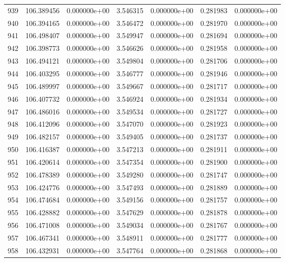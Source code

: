 \begin{tabular}{rrrrrrr}
 939 & 106.389456 &  0.000000e+00 &  3.546315 &  0.000000e+00 &   0.281983 &  0.000000e+00 \\
 940 & 106.394165 &  0.000000e+00 &  3.546472 &  0.000000e+00 &   0.281970 &  0.000000e+00 \\
 941 & 106.498407 &  0.000000e+00 &  3.549947 &  0.000000e+00 &   0.281694 &  0.000000e+00 \\
 942 & 106.398773 &  0.000000e+00 &  3.546626 &  0.000000e+00 &   0.281958 &  0.000000e+00 \\
 943 & 106.494121 &  0.000000e+00 &  3.549804 &  0.000000e+00 &   0.281706 &  0.000000e+00 \\
 944 & 106.403295 &  0.000000e+00 &  3.546777 &  0.000000e+00 &   0.281946 &  0.000000e+00 \\
 945 & 106.489997 &  0.000000e+00 &  3.549667 &  0.000000e+00 &   0.281717 &  0.000000e+00 \\
 946 & 106.407732 &  0.000000e+00 &  3.546924 &  0.000000e+00 &   0.281934 &  0.000000e+00 \\
 947 & 106.486016 &  0.000000e+00 &  3.549534 &  0.000000e+00 &   0.281727 &  0.000000e+00 \\
 948 & 106.412096 &  0.000000e+00 &  3.547070 &  0.000000e+00 &   0.281923 &  0.000000e+00 \\
 949 & 106.482157 &  0.000000e+00 &  3.549405 &  0.000000e+00 &   0.281737 &  0.000000e+00 \\
 950 & 106.416387 &  0.000000e+00 &  3.547213 &  0.000000e+00 &   0.281911 &  0.000000e+00 \\
 951 & 106.420614 &  0.000000e+00 &  3.547354 &  0.000000e+00 &   0.281900 &  0.000000e+00 \\
 952 & 106.478389 &  0.000000e+00 &  3.549280 &  0.000000e+00 &   0.281747 &  0.000000e+00 \\
 953 & 106.424776 &  0.000000e+00 &  3.547493 &  0.000000e+00 &   0.281889 &  0.000000e+00 \\
 954 & 106.474684 &  0.000000e+00 &  3.549156 &  0.000000e+00 &   0.281757 &  0.000000e+00 \\
 955 & 106.428882 &  0.000000e+00 &  3.547629 &  0.000000e+00 &   0.281878 &  0.000000e+00 \\
 956 & 106.471008 &  0.000000e+00 &  3.549034 &  0.000000e+00 &   0.281767 &  0.000000e+00 \\
 957 & 106.467341 &  0.000000e+00 &  3.548911 &  0.000000e+00 &   0.281777 &  0.000000e+00 \\
 958 & 106.432931 &  0.000000e+00 &  3.547764 &  0.000000e+00 &   0.281868 &  0.000000e+00 \\

\end{tabular}

